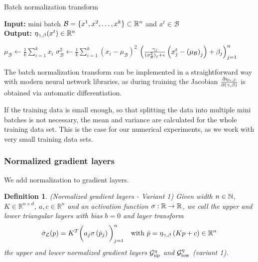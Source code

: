 \documentclass[twoside,a4paper]{article}
\newtheorem{definition}{Definition}
\begin{document}
\begin{algorithm}\label{algo_batch_norm}
	\caption{Batch normalization transform}
	\textbf{Input:} mini batch $\mathcal{B} = \{x^1, x^2, \dots, x^{k}\} \subset \mathbb{R}^n$ 
	and $x^t \in \mathcal{B}$ \\
	\textbf{Output:} $\eta_{\gamma, \beta}(x^t) \in \mathbb{R}^n$
	\begin{algorithmic}
		 
			\State $\mu_\mathcal{B} \gets \frac{1}{k} \sum_{i=1}^{k} x_i$
			\State $\sigma^2_\mathcal{B} \gets \frac{1}{k} \sum_{i=1}^{k} 
			(x_i - \mu_\mathcal{B})^2$
		\EndIf
		\State \Return 
		$\left( \frac{\gamma_j}{(\sigma^2_\mathcal{B})_j + \epsilon} 
		\left( x^t_j - \left( \mu_\mathcal{B} \right)_j \right) + \beta_j \right)_{j=1}^n$
	\end{algorithmic}
\end{algorithm}

The batch normalization transform can be implemented in a straightforward way with modern
neural network libraries, as during training the Jacobian $\frac{\partial \eta_{\gamma, \beta}}{\partial (\gamma, \beta)}$ 
is obtained via automatic differentiation.

If the training data is small enough, so that splitting the data into multiple mini batches
is not necessary, the mean and variance are calculated for the whole training data set. This is the
case for our numerical experiments, as we work with very small training data sets.

\subsubsection{Normalized gradient layers}

We add normalization to gradient layers.

\begin{definition}
	(Normalized gradient layers - Variant 1)
	Given width $n \in \mathbb{N}$, $K \in \mathbb{R}^{n \times d}$, $a,c \in \mathbb{R}^n$ and
	an activation function $\sigma : \mathbb{R} \to \mathbb{R}$,
	we call the upper and lower triangular layers with bias $b=0$ and layer transform
	\begin{equation*}
		\hat{\sigma}_{\mathcal{L}}(p) = K^T \bigg( a_j \sigma
		\left( \hat{p}_j \right) \bigg)_{j=1}^n
		\quad \text{with } \hat{p} = \eta_{\gamma, \beta} \left( Kp + c \right) \in \mathbb{R}^n
	\end{equation*}
	the upper and lower normalized gradient layers 
	$\mathcal{G}_{\text{up}}^{\eta}$ and $\mathcal{G}_{\text{low}}^{\eta}$ (variant 1).
\end{definition}
\end{document}
